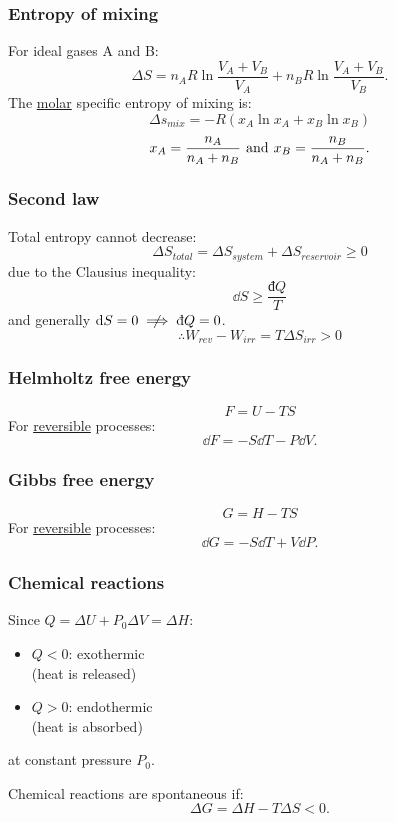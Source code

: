 \documentclass{article}
\newcommand{\idd}{\text{đ}}
\newcommand{\nimplies}{\centernot\implies}
\begin{document}
\begin{multicols*}{3}
\subsubsection*{Entropy of mixing}
For ideal gases A and B:
$$\Delta S=n_A R\ln\frac{V_A+V_B}{V_A}
+n_B R\ln\frac{V_A+V_B}{V_B}.$$
The \underline{molar} specific entropy of mixing is:
$$\Delta s_{mix}=-R(x_A\ln x_A+x_B\ln x_B)$$
$$x_A=\frac{n_A}{n_A+n_B}
\hspace{0.05in}\text{and}\hspace{0.05in}
x_B=\frac{n_B}{n_A+n_B}.$$

\subsubsection*{Second law}
Total entropy cannot decrease:
$$\Delta S_{total}=\Delta S_{system}
+\Delta S_{reservoir}\geq0$$
due to the Clausius inequality:
$$\dd S\geq\frac{\idd Q}{T}$$
and generally $\dd S=0\nimplies \idd Q=0$.
$$\therefore W_{rev}-W_{irr}
=T\Delta S_{irr}>0$$

\subsubsection*{Helmholtz free energy}
$$F=U-TS$$
For \underline{reversible} processes:
$$\dd F=-S\dd T-P\dd V.$$

\subsubsection*{Gibbs free energy}
$$G=H-TS$$
For \underline{reversible} processes:
$$\dd G=-S\dd T+V\dd P.$$

\subsubsection*{Chemical reactions}
Since
$Q=\Delta U+P_0\Delta V=\Delta H$:
\begin{itemize}
    \item $Q<0$: exothermic \\
    (heat is released)
    \item $Q>0$: endothermic \\
    (heat is absorbed)
\end{itemize}
at constant pressure $P_0$.

Chemical reactions are spontaneous if:
$$\Delta G=\Delta H-T\Delta S<0.$$


\end{multicols*}
\end{document}
